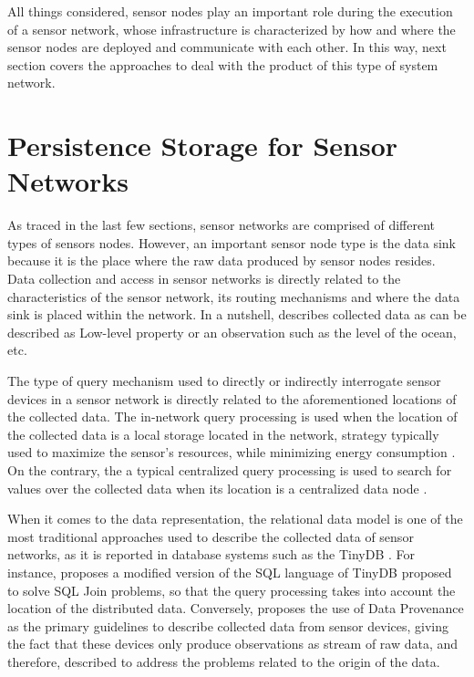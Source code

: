 All things considered, sensor nodes play an important role during the execution
of a sensor network, whose infrastructure is characterized by how and where the
sensor nodes are deployed and communicate with each other. In this way, next
section covers the approaches to deal with the product of this type of system
network.

\section{Persistence Storage for Sensor Networks}

As traced in the last few sections, sensor networks are comprised of
different types of sensors nodes. However, an important sensor node type is the
data sink because it is the place where the raw data produced by sensor
nodes resides. Data collection and access in sensor networks is directly
related to the characteristics of the sensor network, its routing mechanisms
and where the data sink is placed within the network. In a nutshell,
\cite{sn-storage03} describes collected data as can be described as Low-level
property or an observation such as the level of the ocean, etc.

The type of query mechanism used to directly or indirectly interrogate sensor
devices in a sensor network is directly related to the aforementioned locations
of the collected data. The in-network query processing is used when the
location of the collected data is a local storage \cite{sn-storage01,
sn-storage03} located in the network, strategy typically used to maximize the
sensor's resources, while minimizing energy consumption \cite{sn-storage04}. On
the contrary, the a typical centralized query processing is used to search for
values over the collected data when its location is a centralized data
node \cite{sn-storage02}.

When it comes to the data representation, the relational data model
\cite{relational-model} is one of the most traditional approaches used to
describe the collected data of sensor networks, as it is reported in database
systems such as the TinyDB \cite{sn-db-tinydb}. For instance, \cite{sn-db-newop}
proposes a modified version of the SQL language of TinyDB proposed to solve
SQL Join problems, so that the query processing takes into account the location
of the distributed data. Conversely, \cite{sn-provenance} proposes the use of
Data Provenance as the primary guidelines to describe collected data from
sensor devices, giving the fact that these devices only produce observations as
stream of raw data, and therefore, described to address the problems related to
the origin of the data.

